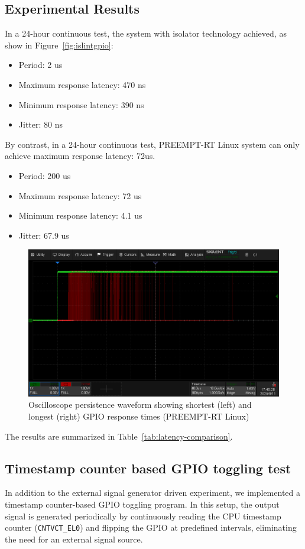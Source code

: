 \documentclass[letterpaper]{article}
\begin{document}
\subsection{Experimental Results}
In a 24-hour continuous test, the system with isolator technology achieved, as show in Figure~\ref{fig:islintgpio}:
\begin{itemize}
    \item Period: 2 us
    \item Maximum response latency: 470 ns
    \item Minimum response latency: 390 ns
    \item Jitter: 80 ns
\end{itemize}


By contrast, in a 24-hour continuous test,  PREEMPT-RT Linux system can only achieve maximum response latency:
72us.
\begin{itemize}
    \item Period: 200 us
    \item Maximum response latency: 72  us
    \item Minimum response latency: 4.1 us
    \item Jitter: 67.9 us
\end{itemize}

\begin{figure}[h]
  \centering
  \includegraphics[width=0.8\linewidth]{figures/linuxintgpio.png}
  \caption{Oscilloscope persistence waveform showing shortest (left) and longest (right) GPIO response times (PREEMPT-RT Linux)}
  \label{fig:linuxintgpio}
\end{figure}

The results are summarized in Table~\ref{tab:latency-comparison}.

\subsection {Timestamp counter based GPIO toggling test} 
In addition to the external signal generator driven experiment, we implemented a timestamp counter-based GPIO toggling program. In this setup, the output signal is generated periodically by continuously reading the CPU timestamp counter (\texttt{CNTVCT\_EL0}) and flipping the GPIO at predefined intervals, eliminating the need for an external signal source.
\end{document}
